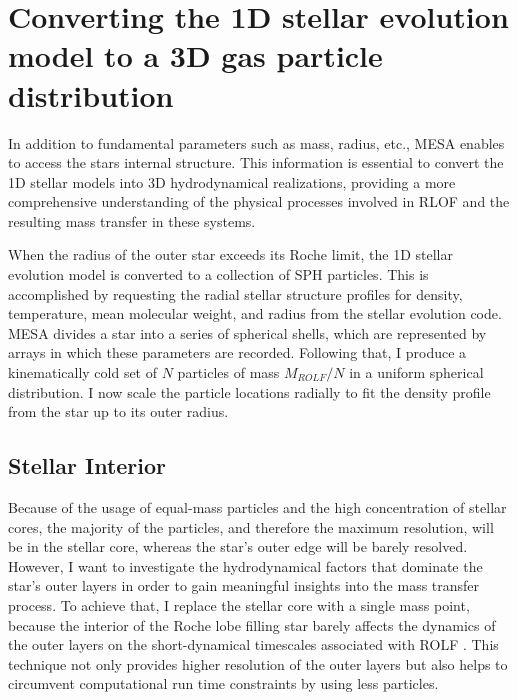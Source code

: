 \section{Converting the 1D stellar evolution model to a 3D gas particle distribution}\label{sec:1D_to_3D}

In addition to fundamental parameters such as mass, radius, etc., MESA enables to access the stars internal structure. This information is essential to convert the 1D stellar models into 3D hydrodynamical realizations, providing a more comprehensive understanding of the physical processes involved in RLOF and the resulting mass transfer in these systems.

When the radius of the outer star exceeds its Roche limit, the 1D stellar evolution model is converted to a collection of SPH particles. This is accomplished by requesting the radial stellar structure profiles for density, temperature, mean molecular weight, and radius from the stellar evolution code. MESA divides a star into a series of spherical shells, which are represented by arrays in which these parameters are recorded. Following that, I produce a kinematically cold set of $N$ particles of mass $M_{ROLF}/N$ in a uniform spherical distribution. I now scale the particle locations radially to fit the density profile from the star up to its outer radius.

\subsection{Stellar Interior}\label{sub:core}

Because of the usage of equal-mass particles and the high concentration of stellar cores, the majority of the particles, and therefore the maximum resolution, will be in the stellar core, whereas the star's outer edge will be barely resolved. However, I want to investigate the hydrodynamical factors that dominate the star's outer layers in order to gain meaningful insights into the mass transfer process. To achieve that, I replace the stellar core with a single mass point, because the interior of the Roche lobe filling star barely affects the dynamics of the outer layers on the short-dynamical timescales associated with ROLF \citep{deupree2005structure}.  This technique not only provides higher resolution of the outer layers but also helps to circumvent computational run time constraints by using less particles.

